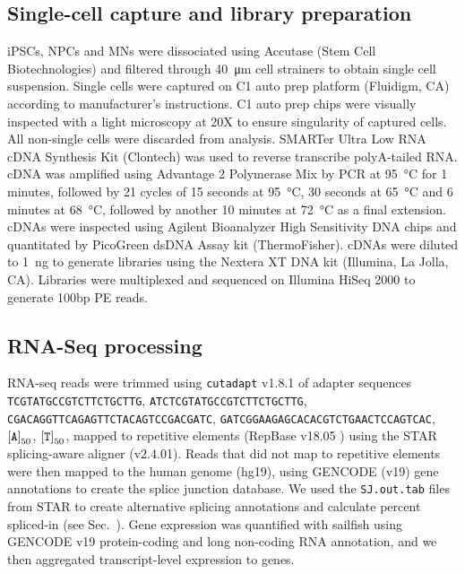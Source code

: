 \subsection{Single-cell capture and library preparation}

iPSCs, NPCs and MNs were dissociated using Accutase (Stem Cell\\Biotechnologies) and filtered through \SI{40}{\micro\meter} cell strainers to obtain single cell suspension. Single cells were captured on C1 auto prep platform (Fluidigm, CA) according to manufacturer's instructions. C1 auto prep chips were visually inspected with a light microscopy at 20X to ensure singularity of captured cells. All non-single cells were discarded from analysis. SMARTer Ultra Low RNA cDNA Synthesis Kit (Clontech) was used to reverse transcribe polyA-tailed RNA. cDNA was amplified using Advantage 2 Polymerase Mix by PCR at \SI{95}{\degreeCelsius} for 1 minutes, followed by 21 cycles of 15 seconds at \SI{95}{\degreeCelsius}, 30 seconds at \SI{65}{\degreeCelsius} and 6 minutes at \SI{68}{\degreeCelsius}, followed by another 10 minutes at \SI{72}{\degreeCelsius} as a final extension. cDNAs were inspected using Agilent Bioanalyzer High Sensitivity DNA chips and quantitated by PicoGreen dsDNA Assay kit (ThermoFisher). cDNAs were diluted to \SI{1}{\nano\gram} to generate libraries using the Nextera XT DNA kit (Illumina, La Jolla, CA). Libraries were multiplexed and sequenced on Illumina HiSeq 2000 to generate 100bp PE reads.

\subsection{RNA-Seq processing}

RNA-seq reads were trimmed using \texttt{cutadapt} v1.8.1 of adapter sequences \texttt{TCGTATGCCGTCTTCTGCTTG}, \texttt{ATCTCGTATGCCGTCTTCTGCTTG}, \\\texttt{CGACAGGTTCAGAGTTCTACAGTCCGACGATC}, \texttt{GATCGGAAGAGCACACGTCTGAACTCCAGTCAC}, $\left[\text{\texttt{A}}\right]_{50}$, $\left[\text{\texttt{T}}\right]_{50}$, mapped to repetitive elements (RepBase v18.05 \cite{Jurka:2005tp}) using the STAR\cite{Dobin:2013fg} splicing-aware aligner (v2.4.01). Reads that did not map to repetitive elements were then mapped to the human genome (hg19), using GENCODE\cite{Harrow:2012cx} (v19) gene annotations to create the splice junction database. We used the  \texttt{SJ.out.tab} files from STAR to create alternative splicing annotations and calculate percent spliced-in (see Sec.~). Gene expression was quantified with sailfish \cite{Patro:2014jd} using GENCODE v19 protein-coding and long non-coding RNA annotation, and we then aggregated transcript-level expression to genes.

